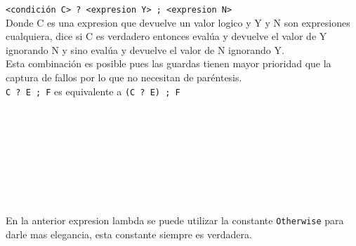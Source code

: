       \texttt{<condición C> ? <expresion Y>~;~<expresion N>}
      \\
      
      Donde C es una expresion que devuelve un valor logico y Y y N son expresiones cualquiera, dice si C es verdadero entonces evalúa y devuelve el valor de Y ignorando N y sino evalúa y devuelve el valor de N ignorando Y.
      \\
      
      Esta combinación es posible pues las guardas tienen mayor prioridad que la captura de fallos por lo que no necesitan de paréntesis.
      \\
      
      \texttt{C ? E ; F} es equivalente a \texttt{(C ? E) ; F}
      \\
      
      \begin{fxcode}
         \\
         \\
         \outcode{()}\\
         \\
         \\
         \\
         \\
         \outcode{()}
      \end{fxcode}
      
      En la anterior expresion lambda se puede utilizar la constante \texttt{Otherwise} para darle mas elegancia, esta constante siempre es verdadera.
      
      \begin{fxcode}
         \\
         \\
         \\
         \\
         \\
         \\
         \outcode{()}
      \end{fxcode}
      
